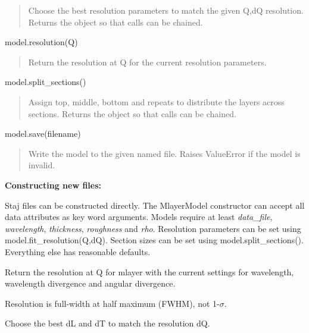 \documentclass[letterpaper,10pt,english]{sphinxmanual}
\begin{document}
\begin{fulllineitems}
\begin{quote}
Choose the best resolution parameters to match the given Q,dQ
resolution.  Returns the object so that calls can be chained.
\end{quote}

model.resolution(Q)
\begin{quote}

Return the resolution at Q for the current resolution parameters.
\end{quote}

model.split\_sections()
\begin{quote}

Assign top, middle, bottom and repeats to distribute the layers
across sections.  Returns the object so that calls can be chained.
\end{quote}

model.save(filename)
\begin{quote}

Write the model to the given named file.  Raises ValueError if
the model is invalid.
\end{quote}

\textbf{Constructing new files:}

Staj files can be constructed directly.  The MlayerModel constructor
can accept all data attributes as key word arguments.  Models require
at least \emph{data\_file}, \emph{wavelength}, \emph{thickness}, \emph{roughness} and \emph{rho}.
Resolution parameters can be set using model.fit\_resolution(Q,dQ).
Section sizes can be set using model.split\_sections().  Everything
else has reasonable defaults.

\begin{fulllineitems}
\label{api/staj:refl1d.staj.MlayerModel.FWHMresolution}
Return the resolution at Q for mlayer with the current settings
for wavelength, wavelength divergence and angular divergence.

Resolution is full-width at half maximum (FWHM), not 1-$\sigma$.

\end{fulllineitems}


\begin{fulllineitems}
\label{api/staj:refl1d.staj.MlayerModel.fit_FWHMresolution}
Choose the best dL and dT to match the resolution dQ.


\end{fulllineitems}
\end{fulllineitems}
\end{document}
